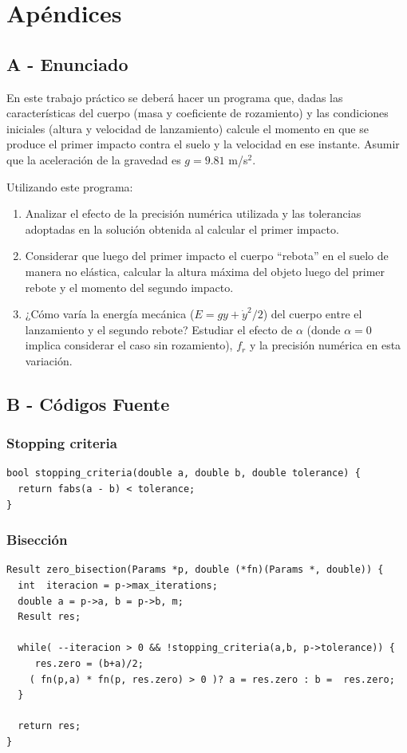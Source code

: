 \documentclass[a4paper]{article}
\begin{document}
\newpage

\section{Apéndices}
\subsection{A - Enunciado}

En este trabajo práctico se deberá hacer un programa que, dadas las características del cuerpo (masa y coeficiente de rozamiento) y las condiciones iniciales (altura y velocidad de lanzamiento) calcule el momento en que se produce el primer impacto contra el suelo y la velocidad en ese instante. Asumir que la aceleración de la gravedad es $g = 9.81$ m/s$^2$.

Utilizando este programa:
\begin{enumerate}
  \item Analizar el efecto de la precisión numérica utilizada y las tolerancias adoptadas en la solución obtenida al calcular el primer impacto.
  
  \item Considerar que luego del primer impacto el cuerpo ``rebota'' en el suelo de manera no elástica, calcular la altura máxima del objeto luego del primer rebote y el momento del segundo impacto.

  \item ¿Cómo varía la energía mecánica ($E = g y +\dot{y}^2/2$) del cuerpo entre el lanzamiento y el segundo rebote? Estudiar el efecto de $\alpha$ (donde $\alpha = 0$ implica considerar el caso sin rozamiento), $f_r$ y la precisión numérica en esta variación.
\end{enumerate}

\subsection{B - Códigos Fuente}

\subsubsection{Stopping criteria}
\begin{verbatim}
bool stopping_criteria(double a, double b, double tolerance) {
  return fabs(a - b) < tolerance;
}
\end{verbatim}

\subsubsection{Bisección}
\begin{verbatim}
Result zero_bisection(Params *p, double (*fn)(Params *, double)) {
  int  iteracion = p->max_iterations;
  double a = p->a, b = p->b, m;
  Result res;

  while( --iteracion > 0 && !stopping_criteria(a,b, p->tolerance)) {
     res.zero = (b+a)/2;
    ( fn(p,a) * fn(p, res.zero) > 0 )? a = res.zero : b =  res.zero;
  }

  return res;
}
\end{verbatim}
\end{document}

